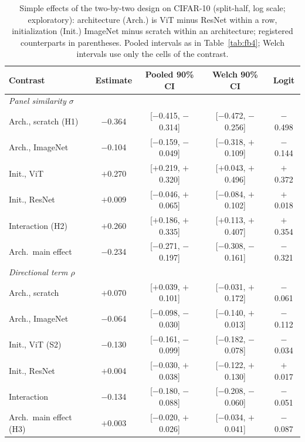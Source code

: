 \begin{table}[!t]
\centering
\caption{Simple effects of the two-by-two design on CIFAR-10 (split-half, log scale; exploratory): architecture (Arch.) is ViT minus ResNet within a row, initialization (Init.) ImageNet minus scratch within an architecture; registered counterparts in parentheses. Pooled intervals as in Table~\ref{tab:fb4}; Welch intervals use only the cells of the contrast.}
\label{tab:simple_effects}
\scriptsize
\setlength{\tabcolsep}{2.5pt}
\begin{tabular}{lcccc}
\toprule
\textbf{Contrast} & \textbf{Estimate} & \textbf{Pooled 90\% CI} & \textbf{Welch 90\% CI} & \textbf{Logit} \\
\midrule
\multicolumn{5}{l}{\textit{Panel similarity $\sigma$}} \\
Arch., scratch (H1) & $-$0.364 & [$-$0.415, $-$0.314] & [$-$0.472, $-$0.256] & $-$0.498 \\
Arch., ImageNet & $-$0.104 & [$-$0.159, $-$0.049] & [$-$0.318, $+$0.109] & $-$0.144 \\
Init., ViT & $+$0.270 & [$+$0.219, $+$0.320] & [$+$0.043, $+$0.496] & $+$0.372 \\
Init., ResNet & $+$0.009 & [$-$0.046, $+$0.065] & [$-$0.084, $+$0.102] & $+$0.018 \\
Interaction (H2) & $+$0.260 & [$+$0.186, $+$0.335] & [$+$0.113, $+$0.407] & $+$0.354 \\
Arch.\ main effect & $-$0.234 & [$-$0.271, $-$0.197] & [$-$0.308, $-$0.161] & $-$0.321 \\
\midrule
\multicolumn{5}{l}{\textit{Directional term $\rho$}} \\
Arch., scratch & $+$0.070 & [$+$0.039, $+$0.101] & [$-$0.031, $+$0.172] & $-$0.061 \\
Arch., ImageNet & $-$0.064 & [$-$0.098, $-$0.030] & [$-$0.140, $+$0.013] & $-$0.112 \\
Init., ViT (S2) & $-$0.130 & [$-$0.161, $-$0.099] & [$-$0.182, $-$0.078] & $-$0.034 \\
Init., ResNet & $+$0.004 & [$-$0.030, $+$0.038] & [$-$0.122, $+$0.130] & $+$0.017 \\
Interaction & $-$0.134 & [$-$0.180, $-$0.088] & [$-$0.208, $-$0.060] & $-$0.051 \\
Arch.\ main effect (H3) & $+$0.003 & [$-$0.020, $+$0.026] & [$-$0.034, $+$0.041] & $-$0.087 \\
\bottomrule
\end{tabular}
\end{table}

